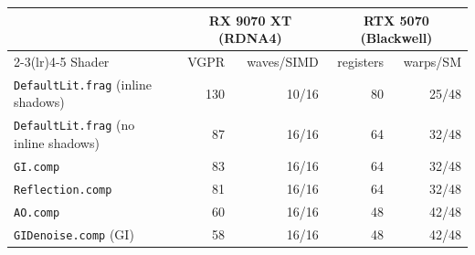 \begin{tabular}{lrrrr}
\toprule
& \multicolumn{2}{c}{RX 9070 XT (RDNA4)} & \multicolumn{2}{c}{RTX 5070 (Blackwell)} \\
\cmidrule(lr){2-3}\cmidrule(lr){4-5}
Shader & VGPR & waves/SIMD & registers & warps/SM \\
\midrule
\texttt{DefaultLit.frag} (inline shadows) & 130 & 10/16 & 80 & 25/48 \\
\texttt{DefaultLit.frag} (no inline shadows) & 87 & 16/16 & 64 & 32/48 \\
\texttt{GI.comp} & 83 & 16/16 & 64 & 32/48 \\
\texttt{Reflection.comp} & 81 & 16/16 & 64 & 32/48 \\
\texttt{AO.comp} & 60 & 16/16 & 48 & 42/48 \\
\texttt{GIDenoise.comp} (GI) & 58 & 16/16 & 48 & 42/48 \\
\bottomrule
\end{tabular}
